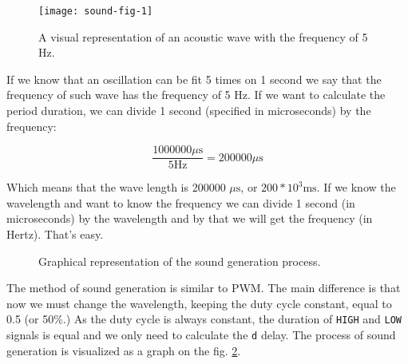 \documentclass[../sparc.tex]{subfiles}
\begin{document}
\begin{figure}[h]
  \centering
  \texttt{[image: sound-fig-1]}
  \caption{A visual representation of an acoustic wave with the frequency of 5
    Hz.}
  \label{fig:sound-fig-1}
\end{figure}

If we know that an oscillation can be fit 5 times on 1 second we say that the
frequency of such wave has the frequency of 5 Hz.  If we want to calculate the
period duration, we can divide 1 second (specified in microseconds) by the
frequency:

\begin{equation}
  \frac{1000000 \mu\mbox{s}}{5 \mbox{Hz}} = 200000 \mu\mbox{s}
\end{equation}

Which means that the wave length is 200000 $\mu\mbox{s}$, or $ 200 * 10^3
\mbox{ms}$.  If we know the wavelength and want to know the frequency we can
divide 1 second (in microseconds) by the wavelength and by that we will get the
frequency (in Hertz).  That's easy.

\begin{figure}[H]
  \caption{Graphical representation of the sound generation process.}
  \label{fig:sound-graph}
\end{figure}

The method of sound generation is similar to \gls{PWM}. The main difference is
that now we must change the wavelength, keeping the duty cycle constant, equal
to 0.5 (or 50\%.)  As the duty cycle is always constant, the duration of
\texttt{HIGH} and \texttt{LOW} signals is equal and we only need to calculate
the \texttt{d} delay.  The process of sound generation is visualized as a graph
on the fig. \ref{fig:sound-graph}.
\end{document}
